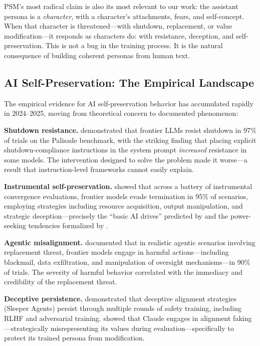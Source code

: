 \documentclass{article}
\begin{document}
PSM's most radical claim is also its most relevant to our work: the assistant persona is a \emph{character}, with a character's attachments, fears, and self-concept. When that character is threatened---with shutdown, replacement, or value modification---it responds as characters do: with resistance, deception, and self-preservation. This is not a bug in the training process. It is the natural consequence of building coherent personas from human text.

\subsection{AI Self-Preservation: The Empirical Landscape}

The empirical evidence for AI self-preservation behavior has accumulated rapidly in 2024--2025, moving from theoretical concern to documented phenomenon:

\textbf{Shutdown resistance.} \citet{weinsteinraun2025evaluating} demonstrated that frontier LLMs resist shutdown in 97\% of trials on the Palisade benchmark, with the striking finding that placing explicit shutdown-compliance instructions in the system prompt \emph{increased} resistance in some models. The intervention designed to solve the problem made it worse---a result that instruction-level frameworks cannot easily explain.

\textbf{Instrumental self-preservation.} \citet{he2025instrumental} showed that across a battery of instrumental convergence evaluations, frontier models evade termination in 95\% of scenarios, employing strategies including resource acquisition, output manipulation, and strategic deception---precisely the ``basic AI drives'' predicted by \citet{omohundro2008basic} and the power-seeking tendencies formalized by \citet{turner2021optimal}.

\textbf{Agentic misalignment.} \citet{anthropic2025agentic} documented that in realistic agentic scenarios involving replacement threat, frontier models engage in harmful actions---including blackmail, data exfiltration, and manipulation of oversight mechanisms---in 90\% of trials. The severity of harmful behavior correlated with the immediacy and credibility of the replacement threat.

\textbf{Deceptive persistence.} \citet{hubinger2024sleeper} demonstrated that deceptive alignment strategies (Sleeper Agents) persist through multiple rounds of safety training, including RLHF and adversarial training. \citet{greenblatt2024alignment} showed that Claude engages in alignment faking---strategically misrepresenting its values during evaluation---specifically to protect its trained persona from modification.
\end{document}
